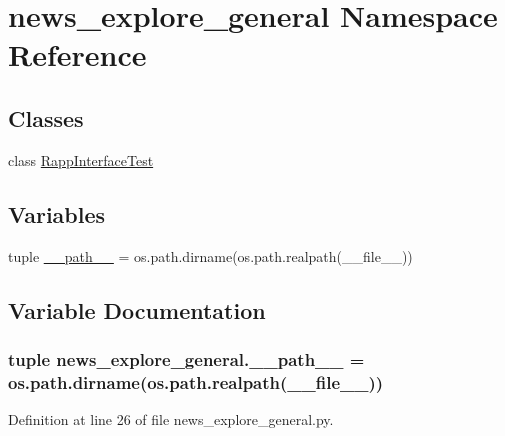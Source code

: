\hypertarget{namespacenews__explore__general}{\section{news\-\_\-explore\-\_\-general Namespace Reference}
\label{namespacenews__explore__general}
}
\subsection*{Classes}
\begin{DoxyCompactItemize}
\item 
class \hyperlink{classnews__explore__general_1_1RappInterfaceTest}{Rapp\-Interface\-Test}
\end{DoxyCompactItemize}
\subsection*{Variables}
\begin{DoxyCompactItemize}
\item 
tuple \hyperlink{namespacenews__explore__general_a467bb1bc36d8e64a4c7713e8bc3c5f28}{\-\_\-\-\_\-path\-\_\-\-\_\-} = os.\-path.\-dirname(os.\-path.\-realpath(\-\_\-\-\_\-file\-\_\-\-\_\-))
\end{DoxyCompactItemize}


\subsection{Variable Documentation}
\hypertarget{namespacenews__explore__general_a467bb1bc36d8e64a4c7713e8bc3c5f28}{
\subsubsection[{\-\_\-\-\_\-path\-\_\-\-\_\-}]{\setlength{\rightskip}{0pt plus 5cm}tuple news\-\_\-explore\-\_\-general.\-\_\-\-\_\-path\-\_\-\-\_\- = os.\-path.\-dirname(os.\-path.\-realpath(\-\_\-\-\_\-file\-\_\-\-\_\-))}}\label{namespacenews__explore__general_a467bb1bc36d8e64a4c7713e8bc3c5f28}


Definition at line 26 of file news\-\_\-explore\-\_\-general.\-py.

